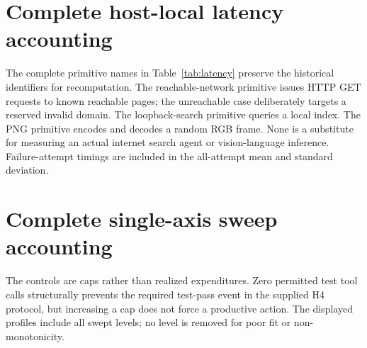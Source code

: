 \documentclass[11pt]{article}
\begin{document}


\clearpage
\appendix
\section{Complete host-local latency accounting}

The complete primitive names in Table~\ref{tab:latency} preserve the historical identifiers for recomputation. The reachable-network primitive issues HTTP GET requests to known reachable pages; the unreachable case deliberately targets a reserved invalid domain. The loopback-search primitive queries a local index. The PNG primitive encodes and decodes a random RGB frame. None is a substitute for measuring an actual internet search agent or vision-language inference. Failure-attempt timings are included in the all-attempt mean and standard deviation.

\clearpage
\section{Complete single-axis sweep accounting}

The controls are caps rather than realized expenditures. Zero permitted test tool calls structurally prevents the required test-pass event in the supplied H4 protocol, but increasing a cap does not force a productive action. The displayed profiles include all swept levels; no level is removed for poor fit or non-monotonicity.
\end{document}
